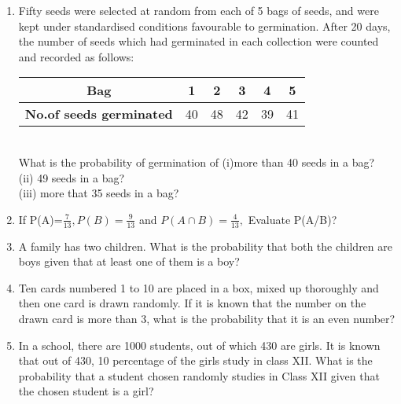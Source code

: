 \begin{enumerate}[label=\arabic*.,ref=\thesubsection.\theenumi]
(i) Find the probability that the weight of a student in the class lies in the interval 46-50 kg.\\
(ii) Give two events in this context, one having probability 0 and the other having probability 1.\\

\item Fifty seeds were selected at random from each of 5 bags of seeds, and were kept under standardised conditions favourable to germination. After 20 days, the
number of seeds which had germinated in each collection were counted and recorded as follows:\\

\begin{tabular}{ |c|c|c|c|c|c| } 
 \hline
 \textbf{Bag} &1 &2 &3 &4 &5\\ 
 \hline
\textbf{No.of seeds germinated} &40 &48 &42 &39 &41 \\ 
 \hline
\end{tabular}\\

What is the probability of germination of
(i)more than 40 seeds in a bag?\\
(ii) 49 seeds in a bag?\\
(iii) more that 35 seeds in a bag?\\


\item If P(A)=$\frac{7}{13}, P(B)=\frac{9}{13}$ and $P(A\cap B)=\frac{4}{13},$ Evaluate P(A/B)?\\

\item A family has two children. What is the probability that both the children are boys given that at least one of them is a boy?\\

\item Ten cards numbered 1 to 10 are placed in a box, mixed up thoroughly and then one card is drawn randomly. If it is known that the number on the drawn card is more than 3, what is the probability that it is an even number?\\

\item In a school, there are 1000 students, out of which 430 are girls. It is known that out of 430,  10 percentage of the girls study in class XII. What is the probability that a student chosen randomly studies in Class XII given that the chosen student is a girl?\\


\end{enumerate}
